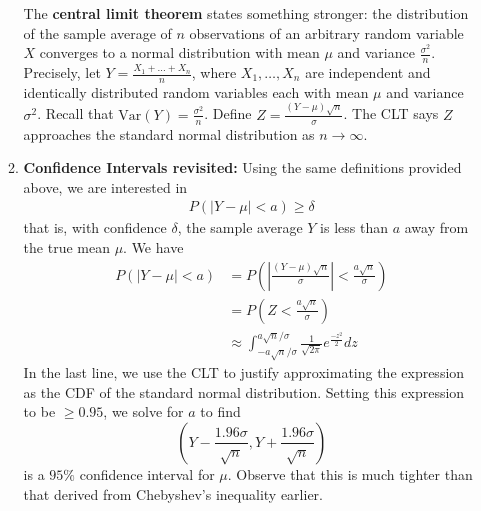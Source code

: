 \documentclass[10pt]{article}
\begin{document}
\begin{multicols}{2}
\begin{enumerate}
\begin{enumerate}
            The \textbf{central limit theorem} states something stronger: the distribution of the sample average of $n$ observations of an arbitrary random variable $X$ converges to a normal distribution with mean $\mu$ and variance $\frac{\sigma^2}{n}$. \\
            
            Precisely, let $Y=\frac{X_1+\ldots+X_n}{n}$, where $X_1, \ldots, X_n$ are independent and identically distributed random variables each with mean $\mu$ and variance $\sigma^2$. Recall that $\text{Var}(Y)=\frac{\sigma^2}{n}$. Define $Z=\frac{(Y-\mu)\sqrt{n}}{\sigma}$. The CLT says $Z$ approaches the standard normal distribution as $n\rightarrow\infty$.
            
            \item \textbf{Confidence Intervals revisited:} Using the same definitions provided above, we are interested in
            \begin{align*}
                P(|Y-\mu| < a) \geq \delta
            \end{align*}
            that is, with confidence $\delta$, the sample average $Y$ is less than $a$ away from the true mean $\mu$. We have 
            \begin{align*}
                P(|Y-\mu| < a) &= P\left(\left| \frac{(Y-\mu)\sqrt{n}}{\sigma}\right| < \frac{a\sqrt{n}}{\sigma}\right) \\
                &= P\left( Z < \frac{a\sqrt{n}}{\sigma} \right) \\
                &\approx \int_{-a\sqrt{n} / \sigma}^{a\sqrt{n} / \sigma} \frac{1}{\sqrt{2\pi}} e^{\frac{-z^2}{2}} dz
            \end{align*}
            In the last line, we use the CLT to justify approximating the expression as the CDF of the standard normal distribution. Setting this expression to be $\geq 0.95$, we solve for $a$ to find $$\left(Y - \frac{1.96\sigma}{\sqrt{n}}, Y + \frac{1.96\sigma}{\sqrt{n}} \right)$$ is a $95\%$ confidence interval for $\mu$. Observe that this is much tighter than that derived from Chebyshev's inequality earlier.
        \end{enumerate}
    \end{enumerate}

\end{multicols}
\end{document}
